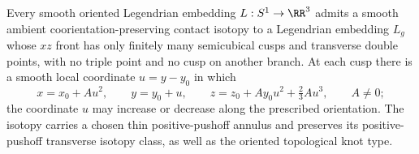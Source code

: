 \begin{theorem}
\label{fd:generic-front}\leanok
Every smooth oriented Legendrian embedding $L:S^1\to\RR^3$ admits
a smooth ambient coorientation-preserving contact isotopy to a
Legendrian embedding $L_g$ whose $xz$ front has only finitely many
semicubical cusps and transverse double points, with no triple point
and no cusp on another branch. At each cusp there is a smooth local
coordinate $u=y-y_0$ in which
\begin{equation}\label{fd:generic-exact-germ}
 x=x_0+Au^2,\qquad y=y_0+u,\qquad
 z=z_0+Ay_0u^2+\tfrac23 Au^3,\qquad A\ne0;
\end{equation}
the coordinate $u$ may increase or decrease along the prescribed
orientation. The isotopy carries a chosen thin
positive-pushoff annulus and preserves its positive-pushoff transverse
isotopy class, as well as the oriented topological knot type.

\end{theorem}
